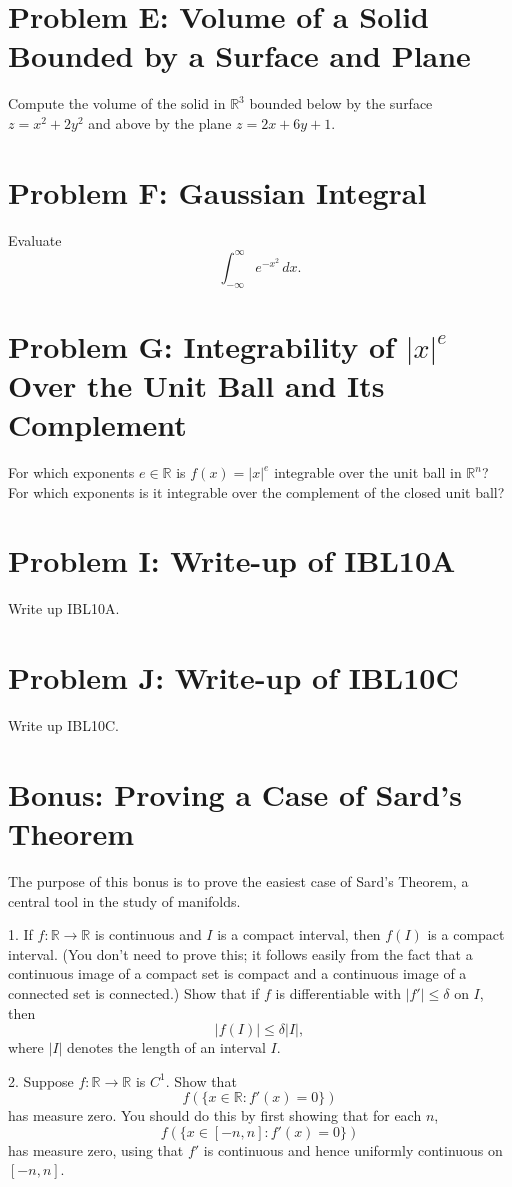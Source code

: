\documentclass[lang=cn,11pt]{template}
\begin{document}
\section*{Problem E: Volume of a Solid Bounded by a Surface and Plane}
Compute the volume of the solid in \( \mathbb{R}^3 \) bounded below by the surface \( z = x^2 + 2y^2 \) and above by the plane \( z = 2x + 6y + 1 \).

\section*{Problem F: Gaussian Integral}
Evaluate
\[
\int_{-\infty}^{\infty} e^{-x^2} \, dx.
\]

\section*{Problem G: Integrability of \( |x|^e \) Over the Unit Ball and Its Complement}
For which exponents \( e \in \mathbb{R} \) is \( f(x) = |x|^e \) integrable over the unit ball in \( \mathbb{R}^n \)? For which exponents is it integrable over the complement of the closed unit ball?

\section*{Problem I: Write-up of IBL10A}
Write up IBL10A.

\section*{Problem J: Write-up of IBL10C}
Write up IBL10C.

\section*{Bonus: Proving a Case of Sard’s Theorem}
The purpose of this bonus is to prove the easiest case of Sard’s Theorem, a central tool in the study of manifolds.

1. If \( f : \mathbb{R} \rightarrow \mathbb{R} \) is continuous and \( I \) is a compact interval, then \( f(I) \) is a compact interval. (You don’t need to prove this; it follows easily from the fact that a continuous image of a compact set is compact and a continuous image of a connected set is connected.) Show that if \( f \) is differentiable with \( |f'| \leq \delta \) on \( I \), then
   \[
   |f(I)| \leq \delta |I|,
   \]
   where \( |I| \) denotes the length of an interval \( I \).

2. Suppose \( f : \mathbb{R} \rightarrow \mathbb{R} \) is \( C^1 \). Show that
   \[
   f(\{x \in \mathbb{R} : f'(x) = 0\})
   \]
   has measure zero. You should do this by first showing that for each \( n \),
   \[
   f(\{x \in [-n, n] : f'(x) = 0\})
   \]
   has measure zero, using that \( f' \) is continuous and hence uniformly continuous on \( [-n, n] \).
\end{document}
